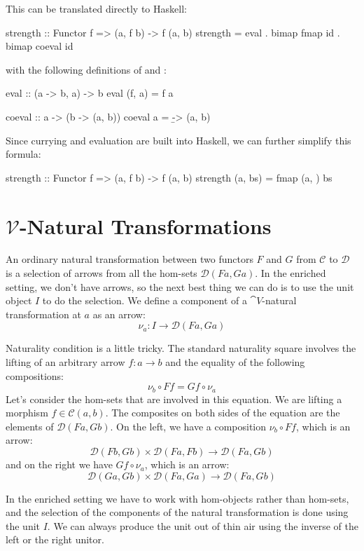 \documentclass[DaoFP]{subfiles}
\begin{document}
This can be translated directly to Haskell:
\begin{haskell}
strength :: Functor f => (a, f b) -> f (a, b)
strength = eval . bimap fmap id . bimap coeval id
\end{haskell}
with the following definitions of  and :
\begin{haskell}
eval :: (a -> b, a) -> b
eval (f, a) = f a
\end{haskell}
\begin{haskell}
coeval :: a -> (b -> (a, b))
coeval a = \b -> (a, b)
\end{haskell}
Since currying and evaluation are built into Haskell, we can further simplify this formula:
\begin{haskell}
strength :: Functor f => (a, f b) -> f (a, b)
strength (a, bs) = fmap (a, ) bs
\end{haskell}

\section{$\mathcal V$-Natural Transformations}

An ordinary natural transformation between two functors $F$ and $G$ from $\mathcal C$ to $\mathcal D$ is a selection of arrows from all the hom-sets $\mathcal D(F a, G a)$. In the enriched setting, we don't have arrows, so the next best thing we can do is to use the unit object $I$ to do the selection. We define a component of a $\cat V$-natural transformation at $a$ as an arrow:
\[ \nu_a \colon I \to \mathcal D(F a, G a) \]

Naturality condition is a little tricky. The standard naturality square involves the lifting of an arbitrary arrow $f \colon a \to b$ and the equality of the following compositions:
\[ \nu_b \circ F f = G f \circ \nu_a \]
Let's consider the hom-sets that are involved in this equation. We are lifting a morphism $f \in \mathcal C(a, b)$. The composites on both sides of the equation are the elements of $\mathcal D(F a, G b)$. On the left, we have a composition $ \nu_b \circ F f$, which is an arrow:
\[  \mathcal D(F b, G b) \times \mathcal D(F a, F b) \to \mathcal D(F a, G b) \]
and on the right we have $G f \circ \nu_a$, which is an arrow:
\[ \mathcal D(G a, G b) \times \mathcal D(F a, G a) \to  \mathcal D(F a, G b) \]

In the enriched setting we have to work with hom-objects rather than hom-sets, and the selection of the components of the natural transformation is done using the unit $I$. We can always produce the unit out of thin air using the inverse of the left or the right unitor. 
\end{document}

